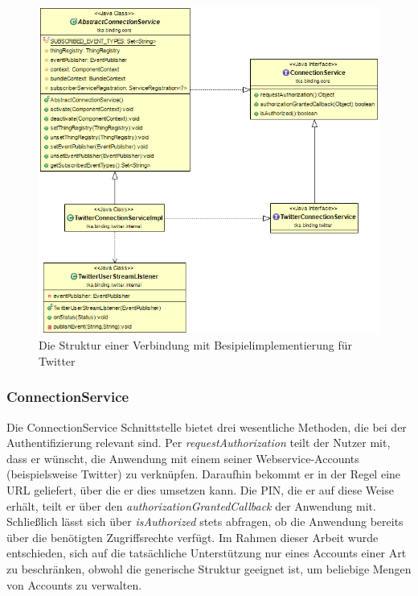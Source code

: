 \begin{figure}[h]
	\centering
	\includegraphics[width=\textwidth]{bilder/ConnectionService}
	\caption{Die Struktur einer Verbindung mit Besipielimplementierung für Twitter}
	\label{fig:connectionservice}
\end{figure}

\subsubsection{ConnectionService}
Die ConnectionService Schnittstelle bietet drei wesentliche Methoden, die bei der Authentifizierung relevant sind. Per \textit{requestAuthorization} teilt der Nutzer mit, dass er wünscht, die Anwendung mit einem seiner Webservice-Accounts (beispielsweise Twitter) zu verknüpfen. Daraufhin bekommt er in der Regel eine URL geliefert, über die er dies umsetzen kann. Die PIN, die er auf diese Weise erhält, teilt er über den \textit{authorizationGrantedCallback} der Anwendung mit. Schließlich lässt sich über \textit{isAuthorized} stets abfragen, ob die Anwendung bereits über die benötigten Zugriffsrechte verfügt. Im Rahmen dieser Arbeit wurde entschieden, sich auf die tatsächliche Unterstützung nur eines Accounts einer Art zu beschränken, obwohl die generische Struktur geeignet ist, um beliebige Mengen von Accounts zu verwalten.

